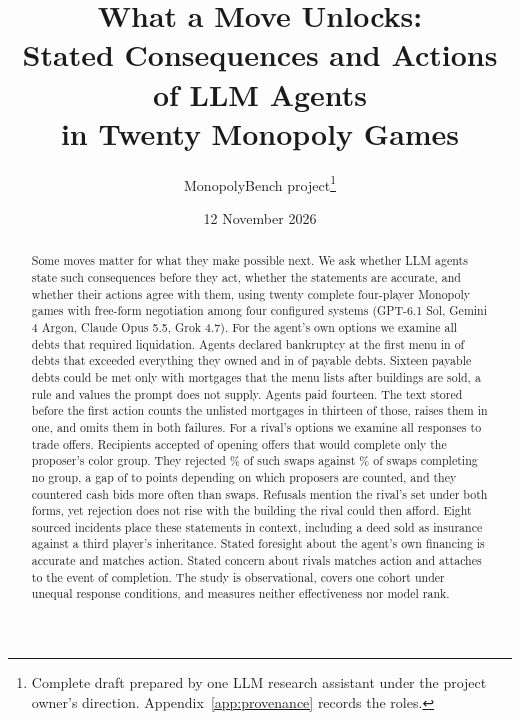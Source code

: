 \documentclass[11pt,letterpaper]{article}
\title{What a Move Unlocks:\\Stated Consequences and Actions of LLM Agents\\in Twenty Monopoly Games}
\author{MonopolyBench project\thanks{Complete draft prepared by one LLM research assistant under the project owner's direction. Appendix~\ref{app:provenance} records the roles.}}
\date{12 November 2026}
\begin{document}



\maketitle
\begin{abstract}
\noindent Some moves matter for what they make possible next. We ask whether LLM agents state such consequences before they act, whether the statements are accurate, and whether their actions agree with them, using twenty complete four-player Monopoly games with free-form negotiation among four configured systems (GPT-6.1 Sol, Gemini 4 Argon, Claude Opus 5.5, Grok 4.7). For the agent's own options we examine all  debts that required liquidation. Agents declared bankruptcy at the first menu in  of  debts that exceeded everything they owned and in  of  payable debts. Sixteen payable debts could be met only with mortgages that the menu lists after buildings are sold, a rule and values the prompt does not supply. Agents paid fourteen. The text stored before the first action counts the unlisted mortgages in thirteen of those, raises them in one, and omits them in both failures. For a rival's options we examine all  responses to trade offers. Recipients accepted  of  opening offers that would complete only the proposer's color group. They rejected \% of such swaps against \% of swaps completing no group, a gap of  to  points depending on which proposers are counted, and they countered cash bids more often than swaps. Refusals mention the rival's set under both forms, yet rejection does not rise with the building the rival could then afford. Eight sourced incidents place these statements in context, including a deed sold as insurance against a third player's inheritance. Stated foresight about the agent's own financing is accurate and matches action. Stated concern about rivals matches action and attaches to the event of completion. The study is observational, covers one cohort under unequal response conditions, and measures neither effectiveness nor model rank.
\end{abstract}






\begingroup\small

\endgroup
\clearpage\appendix

\end{document}
